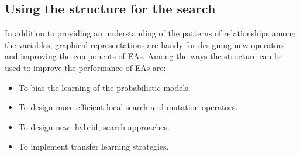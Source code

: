 \documentclass{article} %
\begin{document}



\subsection{Using the structure for the search}


In addition to providing an understanding of the patterns of relationships among the variables, graphical representations are handy for designing new operators and improving the components of EAs. Among the ways the structure can be used to improve the performance of EAs are:

\begin{itemize} 
 \item To bias the learning of the probabilistic models. 
 \item To design more efficient local search and mutation operators.
 \item To design new, hybrid, search approaches. 
 \item To implement transfer learning strategies. 
\end{itemize} 
\end{document}

